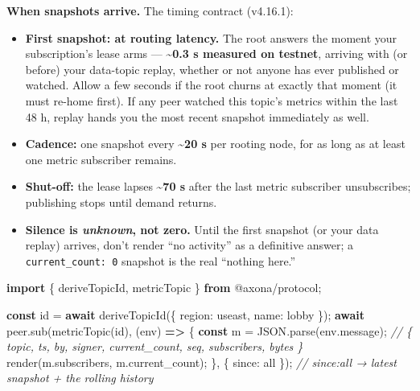 \documentclass[
  nobib]{tufte-handout}
\newenvironment{Shaded}{}{}
\newcommand{\AttributeTok}[1]{\textcolor[rgb]{0.49,0.56,0.16}{#1}}
\newcommand{\BuiltInTok}[1]{\textcolor[rgb]{0.00,0.50,0.00}{#1}}
\newcommand{\CommentTok}[1]{\textcolor[rgb]{0.38,0.63,0.69}{\textit{#1}}}
\newcommand{\ControlFlowTok}[1]{\textcolor[rgb]{0.00,0.44,0.13}{\textbf{#1}}}
\newcommand{\DataTypeTok}[1]{\textcolor[rgb]{0.56,0.13,0.00}{#1}}
\newcommand{\FunctionTok}[1]{\textcolor[rgb]{0.02,0.16,0.49}{#1}}
\newcommand{\ImportTok}[1]{\textcolor[rgb]{0.00,0.50,0.00}{\textbf{#1}}}
\newcommand{\KeywordTok}[1]{\textcolor[rgb]{0.00,0.44,0.13}{\textbf{#1}}}
\newcommand{\NormalTok}[1]{#1}
\newcommand{\OperatorTok}[1]{\textcolor[rgb]{0.40,0.40,0.40}{#1}}
\newcommand{\StringTok}[1]{\textcolor[rgb]{0.25,0.44,0.63}{#1}}
\providecommand{\tightlist}{%
  \setlength{\itemsep}{0pt}\setlength{\parskip}{0pt}}
\begin{document}
\textbf{When snapshots arrive.} The timing contract (v4.16.1):

\begin{itemize}
\tightlist
\item
  \textbf{First snapshot: at routing latency.} The root answers the
  moment your subscription's lease arms --- \textbf{\textasciitilde0.3 s
  measured on testnet}, arriving with (or before) your data-topic
  replay, whether or not anyone has ever published or watched. Allow a
  few seconds if the root churns at exactly that moment (it must re-home
  first). If any peer watched this topic's metrics within the last 48 h,
  replay hands you the most recent snapshot immediately as well.
\item
  \textbf{Cadence:} one snapshot every \textbf{\textasciitilde20 s} per
  rooting node, for as long as at least one metric subscriber remains.
\item
  \textbf{Shut-off:} the lease lapses \textbf{\textasciitilde70 s} after
  the last metric subscriber unsubscribes; publishing stops until demand
  returns.
\item
  \textbf{Silence is \emph{unknown}, not zero.} Until the first snapshot
  (or your data replay) arrives, don't render ``no activity'' as a
  definitive answer; a \texttt{current\_count:\ 0} snapshot is the real
  ``nothing here.''
\end{itemize}

\begin{Shaded}
\begin{Highlighting}[]
\ImportTok{import}\NormalTok{ \{ deriveTopicId}\OperatorTok{,}\NormalTok{ metricTopic \} }\ImportTok{from} \StringTok{\textquotesingle{}@axona/protocol\textquotesingle{}}\OperatorTok{;}

\KeywordTok{const}\NormalTok{ id }\OperatorTok{=} \ControlFlowTok{await} \FunctionTok{deriveTopicId}\NormalTok{(\{ }\DataTypeTok{region}\OperatorTok{:} \StringTok{\textquotesingle{}useast\textquotesingle{}}\OperatorTok{,} \DataTypeTok{name}\OperatorTok{:} \StringTok{\textquotesingle{}lobby\textquotesingle{}}\NormalTok{ \})}\OperatorTok{;}
\ControlFlowTok{await}\NormalTok{ peer}\OperatorTok{.}\FunctionTok{sub}\NormalTok{(}\FunctionTok{metricTopic}\NormalTok{(id)}\OperatorTok{,}\NormalTok{ (env) }\KeywordTok{=\textgreater{}}\NormalTok{ \{}
  \KeywordTok{const}\NormalTok{ m }\OperatorTok{=} \BuiltInTok{JSON}\OperatorTok{.}\FunctionTok{parse}\NormalTok{(env}\OperatorTok{.}\AttributeTok{message}\NormalTok{)}\OperatorTok{;}
  \CommentTok{// \{ topic, ts, by, signer, current\_count, seq, subscribers, bytes \}}
  \FunctionTok{render}\NormalTok{(m}\OperatorTok{.}\AttributeTok{subscribers}\OperatorTok{,}\NormalTok{ m}\OperatorTok{.}\AttributeTok{current\_count}\NormalTok{)}\OperatorTok{;}
\NormalTok{\}}\OperatorTok{,}\NormalTok{ \{ }\DataTypeTok{since}\OperatorTok{:} \StringTok{\textquotesingle{}all\textquotesingle{}}\NormalTok{ \})}\OperatorTok{;}   \CommentTok{// since:\textquotesingle{}all\textquotesingle{} → latest snapshot + the rolling history}
\end{Highlighting}
\end{Shaded}
\end{document}
